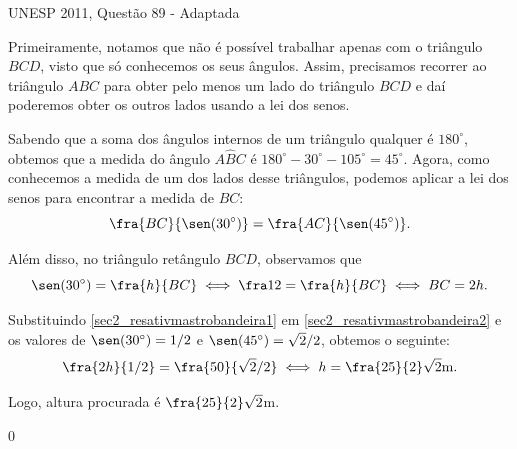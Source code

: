 \begin{answer}{UNESP 2011, Questão 89 - Adaptada}
{
Primeiramente, notamos que não é possível trabalhar apenas com o triângulo $BCD$, visto que só conhecemos os seus ângulos. Assim, precisamos recorrer ao triângulo $ABC$ para obter pelo menos um lado do triângulo $BCD$ e daí poderemos obter os outros lados usando a lei dos senos.

Sabendo que a soma dos ângulos internos de um triângulo qualquer é $180^\circ$, obtemos que a medida do ângulo  $A\hat{B}C$ é $180^\circ-30^\circ-105^\circ=45^\circ$.  Agora, como conhecemos a medida de um dos lados desse triângulos, podemos aplicar a lei dos senos para encontrar a medida de $BC$:
\begin{equation}\label{sec2_resativmastrobandeira2}
    \fra{BC}{\sen(30^\circ)}=\fra{AC}{\sen(45^\circ)}.
\end{equation}

Além disso, no triângulo retângulo $BCD$, observamos que
\begin{equation}\label{sec2_resativmastrobandeira1}
    \sen(30^\circ)=\fra{h}{BC} \iff \fra12=\fra{h}{BC} \iff BC=2h.
\end{equation}

Substituindo \eqref{sec2_resativmastrobandeira1} em \eqref{sec2_resativmastrobandeira2} e os valores de $\sen(30^\circ)=1/2$ e $\sen(45^\circ)=\sqrt{2}/2$, obtemos o seguinte:
$$\fra{2h}{1/2}=\fra{50}{\sqrt{2}/2} \iff h=\fra{25}{2}\sqrt{2}\text{m}.$$

Logo, altura procurada é $\fra{25}{2}\sqrt{2}$m.
}{0}
\end{answer}

